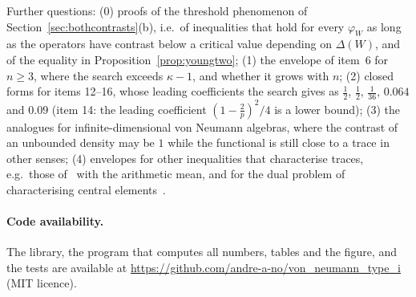 \documentclass[11pt]{article}
\theoremstyle{plain}
\theoremstyle{definition}
\theoremstyle{remark}
\begin{document}
\noindent Further questions: (0) proofs of the threshold phenomenon of Section~\ref{sec:bothcontrasts}(b), i.e.\ of
inequalities that hold for every $\varphi_W$ as long as the operators have contrast below a critical value depending on
$\Delta(W)$, and of the equality in Proposition~\ref{prop:youngtwo}; (1) the envelope of item~6 for $n\ge3$, where the search exceeds $\kappa-1$, and whether it
grows with $n$; (2) closed forms for items 12--16, whose leading coefficients the search gives as $\frac12$, $\frac12$,
$\frac1{36}$, $0.064$ and $0.09$ (item 14: the leading coefficient $(1-\frac2p)^2/4$ is a lower bound); (3) the analogues
for infinite-dimensional von Neumann algebras, where the contrast of an unbounded density may be $1$ while the functional
is still close to a trace in other senses; (4) envelopes for other inequalities that characterise traces, e.g.\ those
of~\cite{moslehian2025jmaa,bikchentaev2026sgm} with the arithmetic mean, and for the dual problem of characterising
central elements~\cite{novikov2015}.

\paragraph{Code availability.} The library, the program that computes all numbers, tables and the figure, and the tests
are available at \url{https://github.com/andre-a-no/von_neumann_type_i} (MIT licence).
\end{document}
